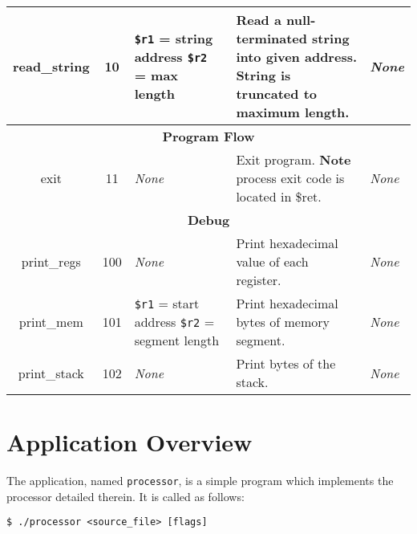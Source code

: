 \documentclass[10pt]{article}
\begin{document}
\begin{longtable}{|c|c|l|l|l|}
        \hline
        read\_string & 10 & \makecell[l]{\texttt{\$r1} = string address\\%
        \texttt{\$r2} = max length} & \makecell[l]{Read a null-terminated string into given address.\\%
        String is truncated to maximum length.} & \textit{None} \\
        \hline \hline
        \multicolumn{5}{|c|}{\textbf{Program Flow}} \\
        \hline
        exit & 11 & \textit{None} & \makecell[l]{Exit program.\\%
        \textbf{Note} process exit code is located in \$ret.} & \textit{None} \\
        \hline \hline
        \multicolumn{5}{|c|}{\textbf{Debug}} \\
        \hline
        print\_regs & 100 & \textit{None} & Print hexadecimal value of each register. & \textit{None} \\
        \hline
        print\_mem & 101 & \makecell[l]{\texttt{\$r1} = start address\\%
        \texttt{\$r2} = segment length} & Print hexadecimal bytes of memory segment. & \textit{None} \\
        \hline
        print\_stack & 102 & \textit{None} & Print bytes of the stack. & \textit{None} \\
        \hline
    \end{longtable}

    \section{Application Overview}

    The application, named \texttt{processor}, is a simple program which implements the processor detailed therein.
    It is called as follows:

    \medskip
    \begin{lstlisting}[style=bashconsole]
$ ./processor <source_file> [flags]
    \end{lstlisting}
\end{document}
